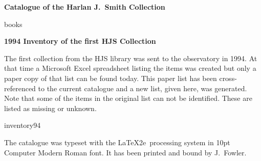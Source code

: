 \documentclass[letterpaper]{book}
\begin{document}
\printbibliography

\mainmatter
\begin{center}
  {\Large \bf Catalogue of the Harlan J.\ Smith Collection}
\end{center}
\bigskip
{books}
\cleardoublepage

\begin{center}
  {\Large \bfseries 1994 Inventory of the first HJS Collection}
\end{center}
The first collection from the HJS library was sent to the observatory
in 1994. At that time a Microsoft Excel spreadsheet listing the items
was created but only a paper copy of that list can be found today.
This paper list has been cross-referenced to the current catalogue and
a new list, given here, was generated. Note that some of the items in
the original list can not be identified. These are listed as missing or
unknown.
\bigskip

{inventory94}



\backmatter

  \printindex[author]

\begin{colophon}
  The catalogue was typeset with the \LaTeX2e\ processing system in
  10pt Computer Modern Roman font. It has been printed and
  bound by J.~Fowler.
\end{colophon}
\end{document}
